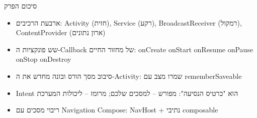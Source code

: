 \begin{tcbsummary}{סיכום הפרק}
\begin{itemize}
  \item ארבעת הרכיבים: Activity (חזית), Service (רקע), BroadcastReceiver (רמקול), ContentProvider (ארון נתונים)
  \item שש פונקציות ה-Callback של מחזור החיים: onCreate onStart onResume onPause onStop onDestroy
  \item סיבוב מסך הורס ובונה מחדש את ה-Activity: שמרו מצב עם rememberSaveable
  \item ‏Intent הוא "כרטיס הנסיעה": מפורש – למסכים שלכם; מרומז – ליכולות המערכת
  \item ריבוי מסכים עם Navigation Compose: NavHost + נתיבי composable
\end{itemize}

\end{tcbsummary}
